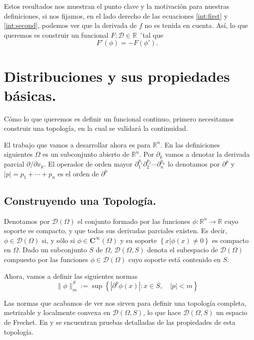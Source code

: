 \documentclass[letter,12pt]{article}
\newcommand\norm[1]{\lVert#1\rVert}
\begin{document}
Estos resultados nos muestran el punto clave y la motivación para nuestras definiciones,
si nos fijamos, en el lado derecho de las ecuaciones \ref{int:first} y
\ref{int:second}, podemos ver que la derivada de $ f $ no es tenida en cuenta.
Así, lo que queremos es construir un funcional $ F: \mathscr{D} \in \mathbb{R} $ ´tal 
que
\begin{equation}
	F'(\phi) = -F(\phi').
\end{equation}

\section{Distribuciones y sus propiedades básicas.}
Cómo lo que queremos es definir un funcional continuo, primero necesitamos construir 
una topología, en la cual se validará la continuidad.

El trabajo que vamos a desarrollar ahora es para $ \mathbb{R}^n $. En las 
definiciones siguientes $ \Omega $ es un subconjunto abierto de 
$ \mathbb{R}^n $. Por $ \partial_{k} $ vamos a denotar la derivada parcial
$ \partial/\partial{x_k} $. El operador de orden mayor 
$ \partial^{p_1}_{1} \partial^{p_2}_{2} \cdots \partial^{p_n}_{n} $ lo denotamos
por $ \partial^p $ y $ |p| = p_1 + \cdots + p_n $ es el orden de $ \partial^p $

\subsection{Construyendo una Topología.}
Denotamos por $ \mathscr{D}(\Omega) $ el conjunto formado por las funciones 
$ \phi: \mathbb{R}^n \to \mathbb{R} $ cuyo soporte es compacto, y que todas sus
derivadas parciales existen. Es decir, $ \phi \in \mathscr{D}(\Omega) $ si, y sólo si
$ \phi \in \mathbf{C}^{\infty}(\Omega) $ y su soporte 
$ \left\{ x| \phi(x) \neq 0 \right\} $ es compacto en $ \Omega $.
Dado un subconjunto $ S $ de $ \Omega $, $ \mathscr{D}(\Omega, S) $ denota el 
subespacio de $ \mathscr{D}(\Omega) $ compuesto por las funciones 
$ \phi\in\mathscr{D}(\Omega) $ cuyo soporte está contenido en $ S $.

Ahora, vamos a definir las siguientes normas
\begin{equation}
 	\norm{\phi}^{S}_{m} := 
 	\sup{ \left\{ |\partial^p{\phi(x)}|: x\in S, \quad |p| < m  \right\} }
\end{equation}

Las normas que acabamos de ver nos sirven para definir una topología completa, 
metrizable y localmente convexa en $ \mathscr{D}(\Omega, S) $, lo que hace 
$ \mathscr{D}(\Omega, S) $ un espacio de Frechet. En \cite{Edwards} y \cite{Rudin}
se encuentran pruebas detalladas de las propiedades de esta topología.
\end{document}

